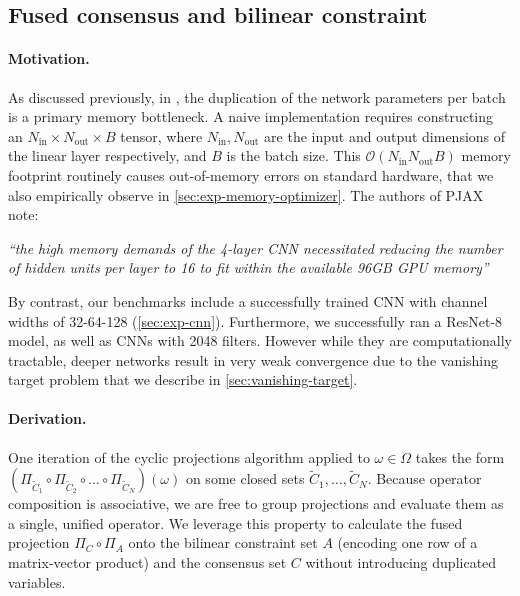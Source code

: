 \subsection{Fused consensus and bilinear constraint} \label{subsec:fused}
\paragraph{Motivation.}
As discussed previously, in \cite{elser2019learning,bergmeister2025projection}, the duplication of the network parameters per batch is a primary memory bottleneck. A naive implementation requires constructing an $N_{\mathrm{in}} \times N_{\mathrm{out}} \times B$ tensor, where $N_{\mathrm{in}}, N_{\mathrm{out}}$ are the input and output dimensions of the linear layer respectively, and $B$ is the batch size. This $\mathcal{O}(N_{\mathrm{in}}N_{\mathrm{out}}B)$ memory footprint routinely causes out-of-memory errors on standard hardware, that we also empirically observe in \cref{sec:exp-memory-optimizer}. The authors of PJAX~\cite{bergmeister2025projection} note: 

\vspace{0.5em}
\textit{``the high memory demands of the 4-layer CNN necessitated reducing the number of hidden units per layer to 16 to fit within the available 96GB GPU memory''}
\vspace{0.5em}

By contrast, our benchmarks include a successfully trained CNN with channel widths of 32-64-128 (\cref{sec:exp-cnn}). Furthermore, we successfully ran a ResNet-8 model, as well as CNNs with 2048 filters. However while they are computationally tractable, deeper networks result in very weak convergence due to the vanishing target problem that we describe in \cref{sec:vanishing-target}.
\paragraph{Derivation.}
One iteration of the cyclic projections algorithm applied to $\omega\in\Omega$ takes the form $(\Pi_{\tilde{C}_1} \circ \Pi_{\tilde{C}_2} \circ \dots \circ \Pi_{\tilde{C}_N})(\omega)$ on some closed sets $\tilde{C}_1,\ldots,\tilde{C}_N$. Because operator composition is associative, we are free to group projections and evaluate them as a single, unified operator. We leverage this property to calculate the fused projection $\Pi_C \circ \Pi_A$ onto the bilinear constraint set $A$ (encoding one row of a matrix-vector product) and the consensus set $C$ without introducing duplicated variables.

